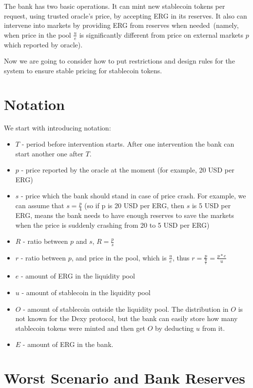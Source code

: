 \documentclass{article}   %
\newcommand{\bc}{ERG}
\newcommand{\stc}{stablecoin}
\newcommand{\sct}{stablecoin}
\newcommand{\dx}{Dexy}
\begin{document}
The bank has two basic operations. It can mint new \sct{} tokens per request, using trusted oracle's price, by accepting \bc{} in its reserves. It also can intervene into markets by providing \bc{} from reserves when needed~(namely, when price in the pool $\frac{u}{e}$ is significantly different from price on external markets $p$ which reported by oracle).

Now we are going to consider how to put restrictions and design rules for the system to ensure stable pricing for \sct{} tokens. 

\section{Notation}

We start with introducing notation: 
\begin{itemize}
  \item{} $T$ - period before intervention starts. After one intervention the bank can start another one after $T$. 
  \item{} $p$ - price reported by the oracle at the moment (for example, 20 USD per ERG)
  \item{} $s$ - price which the bank should stand in case of price crash. For example, we can assume that $s = \frac{p}{4}$ (so if p is 20 USD per ERG, then $s$ is 5 USD per ERG, means the bank needs to have enough reserves to save the markets when the price is suddenly crashing from 20 to 5 USD per ERG)
  \item{} $R$ - ratio between $p$ and $s$, $R = \frac{p}{s}$
  \item{} $r$ - ratio between $p$, and price in the pool, which is $\frac{u}{e}$, thus $r = \frac{p}{\frac{u}{e}} = \frac{p*e}{u}$
  \item{} $e$ - amount of \bc{} in the liquidity pool 
  \item{} $u$ - amount of \stc{} in the liquidity pool
  \item{} $O$ - amount of \stc{} outside the liquidity pool. The distribution in $O$ is not known for the \dx{} protocol, but the bank can easily store how many \sct{} tokens were minted and then get $O$ by deducting $u$ from it.
  \item{} $E$ - amount of \bc{} in the bank. 
\end{itemize}  

\section{Worst Scenario and Bank Reserves}
\end{document}
